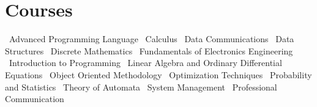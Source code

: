 \documentclass[letterpaper,11pt]{article}
\begin{document}
\section{Courses}
\textbullet \ Advanced Programming Language
\textbullet \ Calculus
\textbullet \ Data Communications
\textbullet \ Data Structures
\textbullet \ Discrete Mathematics
\textbullet \ Fundamentals of Electronics Engineering
\textbullet \ Introduction to Programming
\textbullet \ Linear Algebra and Ordinary Differential Equations
\textbullet \ Object Oriented Methodology
\textbullet \ Optimization Techniques
\textbullet \ Probability and Statistics
\textbullet \ Theory of Automata
\textbullet \ System Management
\textbullet \ Professional Communication

\end{document}
